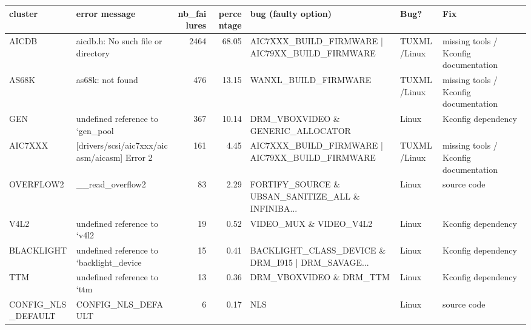 \begin{tabular}{llrrlll}
\toprule
            cluster &                                      error message &  nb\_failures &  percentage &                                bug (faulty option) &         Bug? &                                    Fix \\
\midrule
              AICDB &                 aicdb.h: No such file or directory &         2464 &       68.05 &    AIC7XXX\_BUILD\_FIRMWARE | AIC79XX\_BUILD\_FIRMWARE &  TUXML/Linux &  missing tools / Kconfig documentation \\
              AS68K &                                   as68k: not found &          476 &       13.15 &                               WANXL\_BUILD\_FIRMWARE &  TUXML/Linux &  missing tools / Kconfig documentation \\
                GEN &                   undefined reference to `gen\_pool &          367 &       10.14 &                  DRM\_VBOXVIDEO \& GENERIC\_ALLOCATOR &        Linux &                     Kconfig dependency \\
            AIC7XXX &       [drivers/scsi/aic7xxx/aicasm/aicasm] Error 2 &          161 &        4.45 &    AIC7XXX\_BUILD\_FIRMWARE | AIC79XX\_BUILD\_FIRMWARE &  TUXML/Linux &  missing tools / Kconfig documentation \\
          OVERFLOW2 &                                   \_\_read\_overflow2 &           83 &        2.29 &  FORTIFY\_SOURCE \& UBSAN\_SANITIZE\_ALL \& INFINIBA... &        Linux &                            source code \\
               V4L2 &                       undefined reference to `v4l2 &           19 &        0.52 &                            VIDEO\_MUX \& VIDEO\_V4L2  &        Linux &                     Kconfig dependency \\
         BLACKLIGHT &           undefined reference to `backlight\_device &           15 &        0.41 &  BACKLIGHT\_CLASS\_DEVICE \& DRM\_I915 | DRM\_SAVAGE... &        Linux &                     Kconfig dependency \\
                TTM &                        undefined reference to `ttm &           13 &        0.36 &                            DRM\_VBOXVIDEO \& DRM\_TTM &        Linux &                     Kconfig dependency \\
 CONFIG\_NLS\_DEFAULT &                                 CONFIG\_NLS\_DEFAULT &            6 &        0.17 &                                                NLS &        Linux &                            source code \\

\end{tabular}
